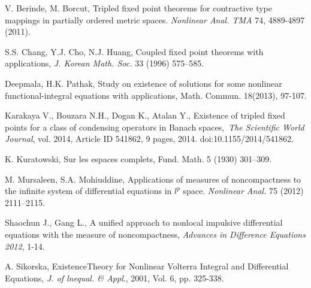\documentclass{amsart}
\theoremstyle{plain}
\numberwithin{equation}{section}
\begin{document}
\begin{thebibliography}{99}
 V. Berinde, M. Borcut, Tripled fixed point theorems for
contractive type mappings in partially ordered metric spaces. \textit{Nonlinear Anal. TMA} 74, 4889-4897 (2011).

 S.S. Chang, Y.J. Cho, N.J. Huang, Coupled fixed point
theorems with applications, \textit{J. Korean Math. Soc.} 33 (1996) 575--585.

 Deepmala, H.K. Pathak, Study on existence of solutions
for some nonlinear functional-integral equations with applications, Math.
Commun. 18(2013), 97-107.

 Karakaya V., Bouzara N.H., Dogan K., Atalan Y., Existence of
tripled fixed points for a class of condensing operators in Banach spaces,\textit{\ The Scientific World Journal}, vol. 2014, Article ID 541862, 9
pages, 2014. doi:10.1155/2014/541862.

 K. Kuratowski, Sur les espaces complets, Fund. Math. 5
(1930) 301--309.

 M. Mursaleen, S.A. Mohiuddine, Applications of measures of
noncompactness to the infinite system of differential equations in $l^{p}$
space. \textit{Nonlinear Anal.} 75 (2012) 2111--2115.

 Shaochun J., Gang L., A unified approach to nonlocal
impulsive differential equations with the measure of noncompactness, \textit{Advances in Difference Equations 2012}, 1-14.

 A. Sikorska, ExistenceTheory for Nonlinear Volterra
Integral and Differential Equations, \textit{J. of lnequal. \& Appl}., 2001,
Vol. 6, pp. 325-338.
\end{thebibliography}
\end{document}
